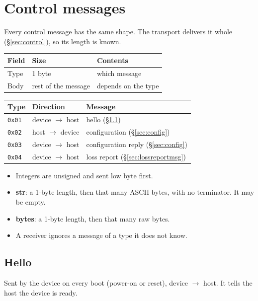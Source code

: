 \documentclass[11pt,a4paper]{article}
\newcommand{\sref}[1]{\S\ref{#1}}
\newcommand{\hex}[1]{\texttt{#1}}
\begin{document}
\section{Control messages}\label{sec:messages}

Every control message has the same shape. The transport delivers it whole
(\sref{sec:control}), so its length is known.

\begin{tabularx}{\linewidth}{@{}l l L@{}}
\toprule
\textbf{Field} & \textbf{Size} & \textbf{Contents} \\
\midrule
Type & 1 byte & which message \\
Body & rest of the message & depends on the type \\
\bottomrule
\end{tabularx}

\medskip

\begin{tabularx}{\linewidth}{@{}l l L@{}}
\toprule
\textbf{Type} & \textbf{Direction} & \textbf{Message} \\
\midrule
\hex{0x01} & device $\to$ host & hello (\sref{sec:hello}) \\
\hex{0x02} & host $\to$ device & configuration (\sref{sec:config}) \\
\hex{0x03} & device $\to$ host & configuration reply (\sref{sec:config}) \\
\hex{0x04} & device $\to$ host & loss report (\sref{sec:lossreportmsg}) \\
\bottomrule
\end{tabularx}

\begin{itemize}
  \item Integers are unsigned and sent low byte first.
  \item \textbf{str}: a 1-byte length, then that many ASCII bytes, with no
        terminator. It may be empty.
  \item \textbf{bytes}: a 1-byte length, then that many raw bytes.
  \item A receiver ignores a message of a type it does not know.
\end{itemize}

\subsection{Hello}\label{sec:hello}

Sent by the device on every boot (power-on or reset), device $\to$ host. It tells the
host the device is ready.
\end{document}
